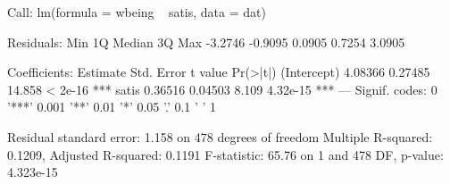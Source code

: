 \begin{Schunk}
\begin{Soutput}
Call:
lm(formula = wbeing ~ satis, data = dat)

Residuals:
    Min      1Q  Median      3Q     Max 
-3.2746 -0.9095  0.0905  0.7254  3.0905 

Coefficients:
            Estimate Std. Error t value Pr(>|t|)    
(Intercept)  4.08366    0.27485  14.858  < 2e-16 ***
satis        0.36516    0.04503   8.109 4.32e-15 ***
---
Signif. codes:  0 '***' 0.001 '**' 0.01 '*' 0.05 '.' 0.1 ' ' 1

Residual standard error: 1.158 on 478 degrees of freedom
Multiple R-squared:  0.1209,	Adjusted R-squared:  0.1191 
F-statistic: 65.76 on 1 and 478 DF,  p-value: 4.323e-15
\end{Soutput}
\end{Schunk}
